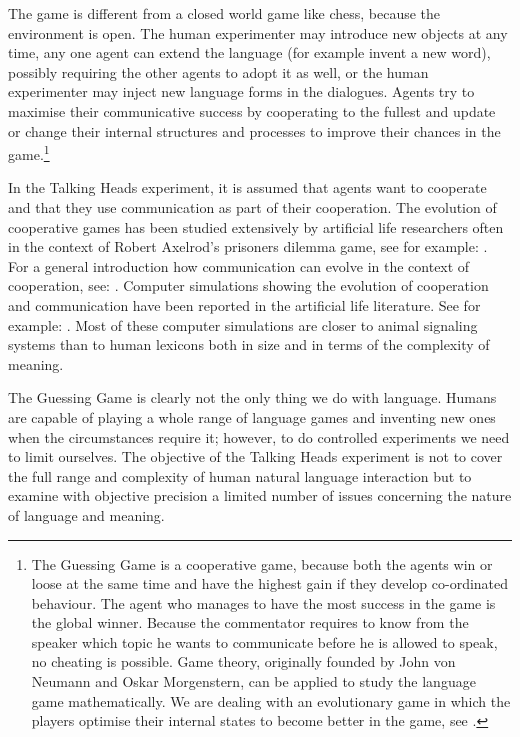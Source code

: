 The game is different from a closed world game like 
chess, because the environment is open. The human 
experimenter may introduce new objects at any
time, any one agent can extend
the language (for example invent a new word), possibly
requiring the other agents to adopt it as well, or the
human experimenter may inject new language forms in the 
dialogues. Agents try to maximise their communicative 
success by cooperating to the fullest and update or change
their internal structures and processes \enlargethispage{1\baselineskip}
to improve their chances in the game.\footnote{
The Guessing Game is a cooperative game, because
both the agents win or loose at the same time and have 
the highest gain if they develop co-ordinated behaviour. 
The agent who manages to have the most success in the game is 
the global winner. Because the commentator requires to know 
from the speaker which topic he wants to communicate 
before he is allowed to speak, no cheating 
is possible. Game theory, originally founded by John 
von Neumann and Oskar Morgenstern, can be applied to study the 
language game mathematically.  We are dealing with an 
evolutionary game in which the players optimise their 
internal states to become better in the game, see
\cite{Maynard:1982}.}

In the Talking Heads experiment, it is assumed that 
agents want to cooperate and that they use communication
as part of their cooperation. 
The evolution of cooperative games has been studied 
extensively by artificial life researchers often 
in the context of Robert Axelrod's prisoners dilemma game, 
see for example: \cite{Ikegami:1994}.  
For a general introduction how communication can 
evolve in the context of cooperation, see: \cite{Hauser:1996}. 
Computer simulations showing the evolution of 
cooperation and communication have been reported in the
artificial life literature. See for example: \cite{MacLennan:1991}. 
Most of these computer simulations are 
closer to animal signaling systems than to human lexicons
both in size and in terms of the complexity of meaning.

The Guessing Game is clearly not the only thing we do 
with language. Humans are capable of playing a whole 
range of language games and inventing
new ones when the circumstances
require it; however, to do controlled experiments we need
to limit ourselves. The objective of the Talking Heads
experiment is not to cover the full range and complexity
of human natural language interaction but to examine with
objective precision a limited number of issues concerning
the nature of language and meaning. 

